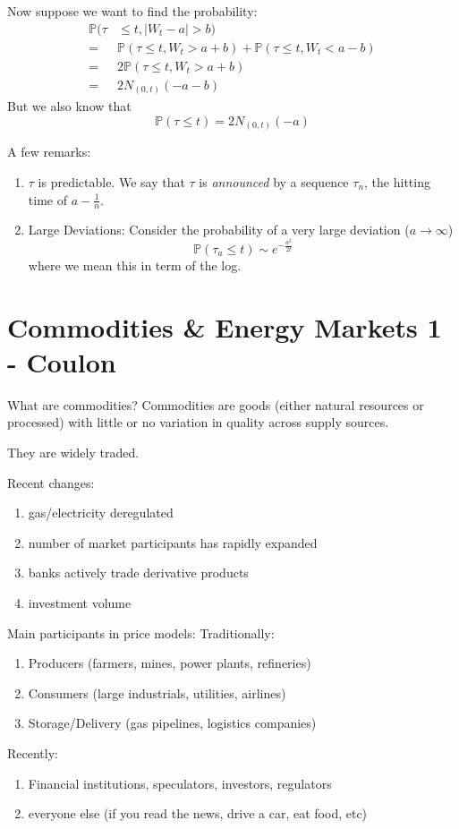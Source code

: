 \documentclass[twocolumn,openany]{book}
\begin{document}
Now suppose we want to find the probability:
\begin{align}
	\mathbb{P}(\tau& \leq t, |W_t-a|> b) \\
	=& \mathbb{P}(\tau \leq t, W_t > a+b) + \mathbb{P}(\tau \leq t, W_t < a-b)\\
	=& 2\mathbb{P}(\tau \leq t, W_t > a+b)\\
	=& 2N_{(0,t)}(-a-b)
\end{align}
But we also know that
\begin{equation}
	\mathbb{P}(\tau \leq t) = 2N_{(0,t)}(-a)
\end{equation}

A few remarks:
\begin{enumerate}
	\item $\tau$ is predictable. We say that $\tau$ is \emph{announced} by a sequence $\tau_n$, the hitting time of $a-\frac1n$.
	\item Large Deviations: Consider the probability of a very large deviation ($a \to \infty$)
	\begin{equation}
		\mathbb{P}(\tau_a \leq t) \sim e^{-\frac{a^2}{2t}}
	\end{equation}
	where we mean this in term of the log.
\end{enumerate}

\chapter{Commodities \& Energy Markets 1 - Coulon}
What are commodities? Commodities are goods (either natural resources or processed) with little or no variation in quality across supply sources.

They are widely traded.

Recent changes:
\begin{enumerate}
	\item gas/electricity deregulated
	\item number of market participants has rapidly expanded
	\item banks actively trade derivative products
	\item investment volume
\end{enumerate}

Main participants in price models: Traditionally:
\begin{enumerate}
	\item Producers (farmers, mines, power plants, refineries)
	\item Consumers (large industrials, utilities, airlines)
	\item Storage/Delivery (gas pipelines, logistics companies)
\end{enumerate}
Recently:
\begin{enumerate}
	\item Financial institutions, speculators, investors, regulators
	\item everyone else (if you read the news, drive a car, eat food, etc)
\end{enumerate}
\end{document}
